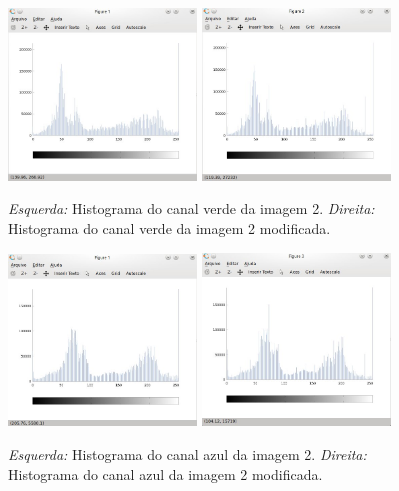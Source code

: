 \begin{figure}[h]
    \centering
    \includegraphics[width=5cm]{HistGreen1.jpg}
    \includegraphics[width=5cm]{HistGreen2.jpg}
    \caption{\emph{Esquerda:} Histograma do canal verde da imagem 2. \emph{Direita:} Histograma do canal verde da imagem 2 modificada.}
    \label{fig:result7}
\end{figure}

\begin{figure}[h]
    \centering
    \includegraphics[width=5cm]{HistBlue1.jpg}
    \includegraphics[width=5cm]{HistBlue2.jpg}
    \caption{\emph{Esquerda:} Histograma do canal azul da imagem 2. \emph{Direita:} Histograma do canal azul da imagem 2 modificada.}
    \label{fig:result8}
\end{figure}


